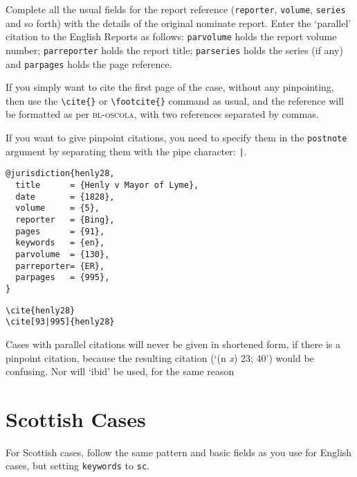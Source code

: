 \documentclass[a5paper,fontsize=9pt,DIV=1]{scrartcl}
\newcommand{\oscola}{\textsc{bl-oscola}}
\newcounter{egcounter}\setcounter{egcounter}{0}
\newenvironment{bibexample}[1][]{%
  \medskip\par\small\noindent\ignorespaces
  \marginpar{[\refstepcounter{egcounter}\arabic{egcounter}]\label{#1}}
  \begin{minipage}[t]{0.95\linewidth}}
 {\end{minipage}\par\medskip}
\newcommand{\egcite}[1]{\texttt{\textbackslash cite#1}}
\begin{document}
Complete all the usual fields for the report reference
(\texttt{reporter}, \texttt{volume}, \texttt{series} and so forth)
with the details of the original nominate report. Enter the `parallel'
citation to the English Reports as follows: \texttt{parvolume} holds the
report volume number; \texttt{parreporter} holds the report title;
\texttt{parseries} holds the series (if any) and \texttt{parpages} holds the
page reference.

If you simply want to cite the first page of the case, without any
pinpointing, then use the \verb|\cite{}| or \verb|\footcite{}| command
as usual, and the reference will be formatted as per \oscola, with two
references separated by commas.

If you want to give pinpoint citations, you need to specify them in
the \texttt{postnote} argument by separating them with the pipe character: \texttt{|}.

\begin{bibexample}[henly28]
\begin{verbatim}
@jurisdiction{henly28,
  title      = {Henly v Mayor of Lyme},
  date       = {1828},
  volume     = {5},
  reporter   = {Bing},
  pages      = {91},
  keywords   = {en},
  parvolume  = {130},
  parreporter= {ER},
  parpages   = {995},
}
\end{verbatim}
\end{bibexample}

\begin{description}%
\item[\egcite{\{henly28\}}] 
\item[\egcite{[93|995]\{henly28\}}] \cite[93|995]{henly28}
\end{description}

Cases with parallel citations will never be given in shortened form,
if there is a pinpoint citation, because the resulting citation (`(n
\emph{x}) 23; 40') would be confusing. Nor will `ibid' be used, for
the same reason


\section{Scottish Cases}

For Scottish cases, follow the same pattern and basic fields as you
use for English cases, but setting \texttt{keywords} to \texttt{sc}.
\end{document}
